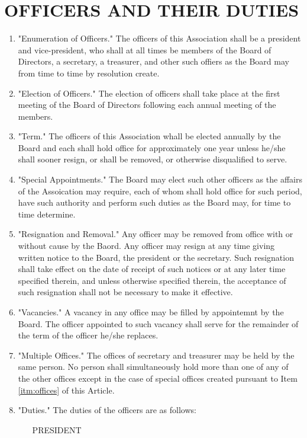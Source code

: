 \documentclass[12pt, letterpaper]{article}
\begin{document}
\section{OFFICERS AND THEIR DUTIES}
\begin{enumerate}
 \item "Enumeration of Officers."
  The officers of this Association shall be a president and vice-president, who shall at all times be members of the Board of Directors, a secretary, a treasurer, and other such offiers as the Board may from time to time by resolution create.
 \item "Election of Officers."
  The election of officers shall take place at the first meeting of the Board of Directors following each annual meeting of the members.
 \item "Term."
  The officers of this Association whall be elected annually by the Board and each shall hold office for approximately one year unless he/she shall sooner resign, or shall be removed, or otherwise disqualified to serve.
 \item "Special Appointments." \label{itm:offices}
  The Board may elect such other officers as the affairs of the Assoication may require, each of whom shall hold office for such period, have such authority and perform such duties as the Board may, for time to time determine.
 \item "Resignation and Removal."
  Any officer may be removed from office with or without cause by the Baord.
  Any officer may resign at any time giving written notice to the Board, the president or the secretary.
  Such resignation shall take effect on the date of receipt of such notices or at any later time specified therein, and unless otherwise specified therein, the acceptance of such resignation shall not be necessary to make it effective.
 \item "Vacancies."
  A vacancy in any office may be filled by appointemnt by the Board.
  The officer appointed to such vacancy shall serve for the remainder of the term of the officer he/she replaces.
 \item "Multiple Offices."
  The offices of secretary and treasurer may be held by the same person.
  No person shall simultaneously hold more than one of any of the other offices except in the case of special offices created pursuant to Item \ref{itm:offices} of this Article. 
 \item "Duties."
  The duties of the officers are as follows:
  \begin{itemize}
   \item[PRESIDENT]

\end{itemize}
\end{enumerate}
\end{document}
